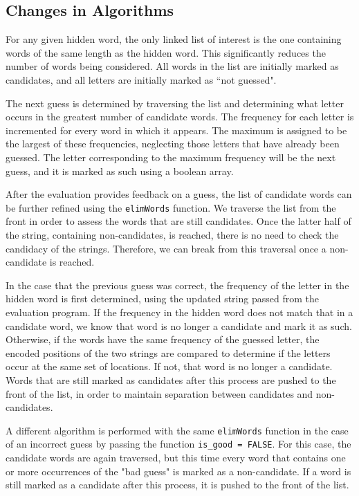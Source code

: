 \documentclass[journal, a4paper]{IEEEtran}
\begin{document}
\subsection{Changes in Algorithms}

For any given hidden word, the only linked list of interest is the one containing words of the same length as the hidden word. This significantly reduces the number of words being considered. All words in the list are initially marked as candidates, and all letters are initially marked as ``not guessed".

The next guess is determined by traversing the list and determining what letter occurs in the greatest number of candidate words. The frequency for each letter is incremented for every word in which it appears. The maximum is assigned to be the largest of these frequencies, neglecting those letters that have already been guessed. The letter corresponding to the maximum frequency will be the next guess, and it is marked as such using a boolean array.

After the evaluation provides feedback on a guess, the list of candidate words can be further refined using the \texttt{elimWords} function. We traverse the list from the front in order to assess the words that are still candidates. Once the latter half of the string, containing non-candidates, is reached, there is no need to check the candidacy of the strings. Therefore, we can break from this traversal once a non-candidate is reached.

In the case that the previous guess was correct, the frequency of the letter in the hidden word is first determined, using the updated string passed from the evaluation program. If the frequency in the hidden word does not match that in a candidate word, we know that word is no longer a candidate and mark it as such. Otherwise, if the words have the same frequency of the guessed letter, the encoded positions of the two strings are compared to determine if the letters occur at the same set of locations. If not, that word is no longer a candidate. Words that are still marked as candidates after this process are pushed to the front of the list, in order to maintain separation between candidates and non-candidates.

A different algorithm is performed with the same \texttt{elimWords} function in the case of an incorrect guess by passing the function \texttt{is\_good = FALSE}. For this case, the candidate words are again traversed, but this time every word that contains one or more occurrences of the "bad guess" is marked as a non-candidate. If a word is still marked as a candidate after this process, it is pushed to the front of the list.
\end{document}
